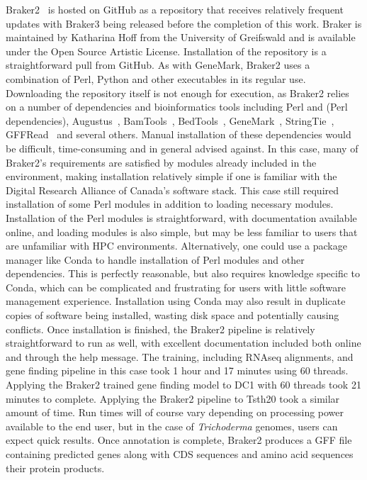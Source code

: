 
Braker2~\cite{bruna2021a} is hosted on GitHub as a repository that
receives relatively frequent updates with Braker3 being released before the completion of this work. Braker is maintained by
Katharina Hoff from the University of Greifswald and is available
under the Open Source Artistic License. Installation of the repository
is a straightforward pull from GitHub. As with GeneMark, Braker2 uses
a combination of Perl, Python and other executables in its regular
use. Downloading the repository itself is not enough for execution, as
Braker2 relies on a number of dependencies and bioinformatics tools
including Perl and (Perl dependencies), Augustus~\cite{stanke2006a},
BamTools~\cite{barnett2011a},
BedTools~\cite{quinlan2010},
GeneMark~\cite{borodovsky2011a}, StringTie~\cite{pertea2015a},
GFFRead~\cite{pertea2020a} and several others. Manual installation of
these dependencies would be difficult, time-consuming and in general
advised against. In this case, many of Braker2's requirements are
satisfied by modules already included in the environment, making
installation relatively simple if one is familiar with the Digital
Research Alliance of Canada's software stack. This case still required
installation of some Perl modules in addition to loading necessary
modules. Installation of the Perl modules is straightforward, with documentation available online, and loading modules is also simple, but may be less familiar to users that are unfamiliar with HPC environments. Alternatively, one could use a package manager like Conda to
handle installation of Perl modules and other dependencies. This is perfectly reasonable, but
also requires knowledge specific to Conda, which can be complicated
and frustrating for users with little software management
experience. Installation using Conda may also result in duplicate copies of software being installed, wasting disk space and potentially causing conflicts.
Once installation is finished, the Braker2 pipeline is
relatively straightforward to run as well, with excellent
documentation included both online and through the help
message. The training, including RNAseq alignments, and gene finding
pipeline in this case took 1 hour and 17 minutes using 60
threads. Applying the Braker2 trained gene finding model to DC1 with
60 threads took 21 minutes to complete. Applying the Braker2 pipeline to Tsth20 took a similar amount of time. Run times will of course vary
depending on processing power available to the end user, but in the
case of \textit{Trichoderma} genomes, users can expect quick results. Once annotation is complete,
Braker2 produces a GFF file containing predicted genes along with CDS
sequences and amino acid sequences their protein products.

